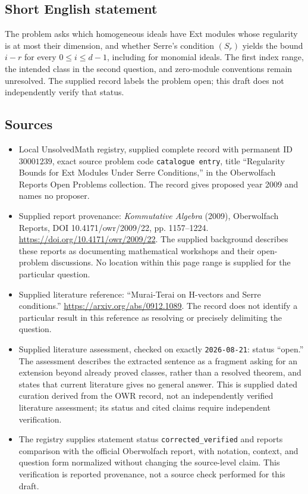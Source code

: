 \documentclass[11pt]{article}
\begin{document}
\subsection{Short English statement}
The problem asks which homogeneous ideals have Ext modules whose regularity is at most their dimension, and whether Serre's condition \((S_r)\) yields the bound \(i-r\) for every \(0\leq i\leq d-1\), including for monomial ideals. The first index range, the intended class in the second question, and zero-module conventions remain unresolved. The supplied record labels the problem open; this draft does not independently verify that status.
\subsection{Sources}
\begin{itemize}
\item Local UnsolvedMath registry, supplied complete record with permanent ID \(30001239\), exact source problem code \texttt{catalogue entry}, title ``Regularity Bounds for Ext Modules Under Serre Conditions,'' in the Oberwolfach Reports Open Problems collection. The record gives proposed year 2009 and names no proposer.
\item Supplied report provenance: \emph{Kommutative Algebra} (2009), Oberwolfach Reports, DOI 10.4171/owr/2009/22, pp. 1157--1224. \url{https://doi.org/10.4171/owr/2009/22}. The supplied background describes these reports as documenting mathematical workshops and their open-problem discussions. No location within this page range is supplied for the particular question.
\item Supplied literature reference: ``Murai-Terai on H-vectors and Serre conditions.'' \url{https://arxiv.org/abs/0912.1089}. The record does not identify a particular result in this reference as resolving or precisely delimiting the question.
\item Supplied literature assessment, checked on exactly \texttt{2026-08-21}: status ``open.'' The assessment describes the extracted sentence as a fragment asking for an extension beyond already proved classes, rather than a resolved theorem, and states that current literature gives no general answer. This is supplied dated curation derived from the OWR record, not an independently verified literature assessment; its status and cited claims require independent verification.
\item The registry supplies statement status \texttt{corrected\_verified} and reports comparison with the official Oberwolfach report, with notation, context, and question form normalized without changing the source-level claim. This verification is reported provenance, not a source check performed for this draft.
\end{itemize}
\end{document}
